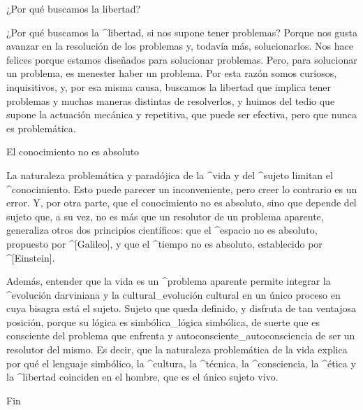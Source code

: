 \Section ¿Por qué buscamos la libertad?

¿Por qué buscamos la ^{libertad}, si nos supone tener problemas? Porque
nos gusta avanzar en la resolución de los problemas y, todavía más,
solucionarlos. Nos hace felices porque estamos diseñados para solucionar
problemas. Pero, para solucionar un problema, es menester haber un
problema. Por esta razón somos curiosos, inquisitivos, y, por esa misma
causa, buscamos la libertad que implica tener problemas y muchas maneras
distintas de resolverlos, y huimos del tedio que supone la actuación
mecánica y repetitiva, que puede ser efectiva, pero que nunca es
problemática.


\Section El conocimiento no es absoluto

La naturaleza problemática y paradójica de la ^{vida} y del ^{sujeto}
limitan el ^{conocimiento}. Esto puede parecer un inconveniente, pero
creer lo contrario es un error. Y, por otra parte, que el conocimiento
no es absoluto, sino que depende del sujeto que, a su vez, no es más que
un resolutor de un problema aparente, generaliza otros dos principios
científicos: que el ^{espacio} no es absoluto, propuesto por ^[Galileo],
y que el ^{tiempo} no es absoluto, establecido por ^[Einstein].

Además, entender que la vida es un ^{problema aparente} permite
integrar la ^{evolución} darviniana y la cultural_{evolución cultural}
en un único proceso en cuya bisagra está el sujeto. Sujeto que queda
definido, y disfruta de tan ventajosa posición, porque su lógica es
simbólica_{lógica simbólica}, de suerte que es consciente del problema
que enfrenta y autoconsciente_{autoconsciencia} de ser un resolutor del
mismo. Es decir, que la naturaleza problemática de la vida explica por
qué el lenguaje simbólico, la ^{cultura}, la ^{técnica}, la
^{consciencia}, la ^{ética} y la ^{libertad} coinciden en el hombre, que
es el único sujeto vivo.

\baselineskip
\centerline{\fonttwo Fin}

\endinput
